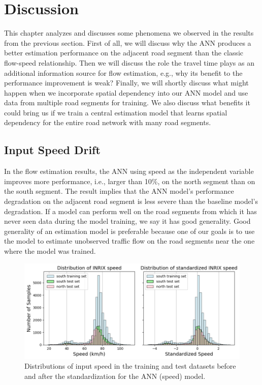 \documentclass[english]{kththesis}
\begin{document}
\chapter{Discussion}
\label{ch:discussion}
This chapter analyzes and discusses some phenomena we observed in the results from the previous section. First of all, we will discuss why the ANN produces a better estimation performance on the adjacent road segment than the classic flow-speed relationship. Then we will discuss the role the travel time plays as an additional information source for flow estimation, e.g., why its benefit to the performance improvement is weak? Finally, we will shortly discuss what might happen when we incorporate spatial dependency into our ANN model and use data from multiple road segments for training. We also discuss what benefits it could bring us if we train a central estimation model that learns spatial dependency for the entire road network with many road segments.

\section{Input Speed Drift}
\label{sec:discussionSpeedDrift}

In the flow estimation results, the ANN using speed as the independent variable improves more performance, i.e., larger than 10\%, on the north segment than on the south segment. The result implies that the ANN model's performance degradation on the adjacent road segment is less severe than the baseline model's degradation. If a model can perform well on the road segments from which it has never seen data during the model training, we say it has good generality. Good generality of an estimation model is preferable because one of our goals is to use the model to estimate unobserved traffic flow on the road segments near the one where the model was trained. 

\begin{figure}[!ht]
    \centering
    \includegraphics[width=1.0\textwidth]{speed_distribution_histogram.png}
    \caption{Distributions of input speed in the training and test datasets before and after the standardization for the ANN (speed) model.}
    \label{fig:distribution_histogram}
\end{figure}
\end{document}
